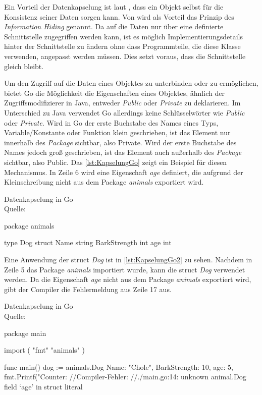 Ein Vorteil der Datenkapselung ist laut \cite[]{Lahres.2011}, dass ein Objekt selbst für die Konsistenz seiner Daten sorgen kann. 
Von \cite[S.86f]{PoetzschHeffter.2009} wird als Vorteil das Prinzip des \emph{Information Hiding} genannt. 
Da auf die Daten nur über eine definierte Schnittstelle zugegriffen werden kann, ist es möglich Implementierungsdetails hinter der Schnittstelle zu ändern ohne dass Programmteile, die diese Klasse verwenden, angepasst werden müssen. 
Dies setzt voraus, dass die Schnittstelle gleich bleibt.

Um den Zugriff auf die Daten eines Objektes zu unterbinden oder zu ermöglichen, bietet Go die Möglichkeit die Eigenschaften eines Objektes, ähnlich der Zugriffsmodifizierer in Java, entweder \emph{Public} oder \emph{Private} zu deklarieren. 
Im Unterschied zu Java verwendet Go allerdings keine Schlüsselwörter wie \emph{Public} oder \emph{Private}.
Wird in Go der erste Buchstabe des Names eines Typs, Variable/Konstante oder Funktion klein geschrieben, ist das Element nur innerhalb des \emph{Package} sichtbar, also Private. 
Wird der erste Buchstabe des Names jedoch groß geschrieben, ist das Element auch außerhalb des \emph{Package} sichtbar, also Public.
Das \autoref{lst:KapselungGo} zeigt ein Beispiel für diesen Mechanismus. 
In Zeile 6 wird eine Eigenschaft \emph{age} definiert, die aufgrund der Kleinschreibung nicht aus dem Package \emph{animals} exportiert wird. 

\begin{listing}[H]
\caption{Datenkapselung in Go \\ Quelle:\cite[]{Kennedy.GoExport}}
\label{lst:KapselungGo}
\begin{GoCode}
package animals

type Dog struct {
    Name string
    BarkStrength int
    age int
}
\end{GoCode}
\end{listing}

Eine Anwendung der struct \emph{Dog} ist in \autoref{lst:KapselungGo2} zu sehen.
Nachdem in Zeile 5 das Package \emph{animals} importiert wurde, kann die struct \emph{Dog} verwendet werden.
Da die Eigenschaft \emph{age} nicht aus dem Package \emph{animals} exportiert wird, gibt der Compiler die Fehlermeldung aus Zeile 17 aus. 

\begin{listing}[H]
\caption{Datenkapselung in Go \\ Quelle:\cite[]{Kennedy.GoExport}}
\label{lst:KapselungGo2}
\begin{GoCode}
package main

import (
    "fmt"
    "animals"
)

func main() {
    dog := animals.Dog{
        Name:         "Chole",
        BarkStrength: 10,
        age:          5,
    }
    fmt.Printf("Counter: %
}
//Compiler-Fehler: 
//./main.go:14: unknown animal.Dog field ‘age’ in struct literal
\end{GoCode}
\end{listing}

